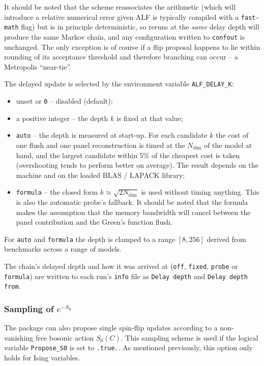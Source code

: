 It should be noted that the scheme reassociates the arithmetic (which will
  introduce a relative numerical error given ALF is typically
compiled with a \texttt{fast-math} flag) but is in principle deterministic,
so reruns at the \emph{same} delay depth will produce the same Markov chain,
and any configuration written to \texttt{confout} is unchanged. The only
exception is of course if a flip proposal happens
to lie within rounding of its acceptance threshold and therefore branching can
occur -- a Metropolis ``near-tie''.

The delayed update is selected by the environment variable
\texttt{ALF\_DELAY\_K}:
\begin{itemize}
  \item unset or \texttt{0} -- disabled (default);
  \item a positive integer -- the depth $k$ is fixed at that value;
  \item \texttt{auto} -- the depth is measured at start-up.  For each candidate
    $k$ the cost of one flush and one panel reconstruction is timed at the
    $N_{\text{dim}}$ of the model at hand, and the largest candidate within
    5\% of the cheapest cost is taken (overshooting tends to perform better
    on average).  The result depends on the machine and on the loaded
    BLAS / LAPACK library;
  \item \texttt{formula} -- the closed form $k \approx \sqrt{2 N_{\text{dim}}}$
    is used without timing anything.  This is also the automatic probe's
    fallback. It should be noted that the formula makes the assumption that the
    memory bandwidth will cancel between the panel contribution and the Green's
    function flush.
\end{itemize}
For \texttt{auto} and \texttt{formula} the depth is clamped to a
range $[8, 256]$ derived from benchmarks across a range of models.

The chain's delayed depth and how it was arrived at
(\texttt{off}, \texttt{fixed}, \texttt{probe} or \texttt{formula}) are written
to
each run's \texttt{info} file as \texttt{Delay depth} and
\texttt{Delay depth from}.
%
\subsubsection{Sampling of $e^{-S_0}$}
\label{sec:S0}
% 
The package can also propose single spin-flip updates according to a non-vanishing free bosonic action $S_0(C)$. This sampling scheme is used if the logical variable \texttt{Propose\_S0} is set to \texttt{.true.}.   As mentioned previously, this option only holds for Ising variables. 

